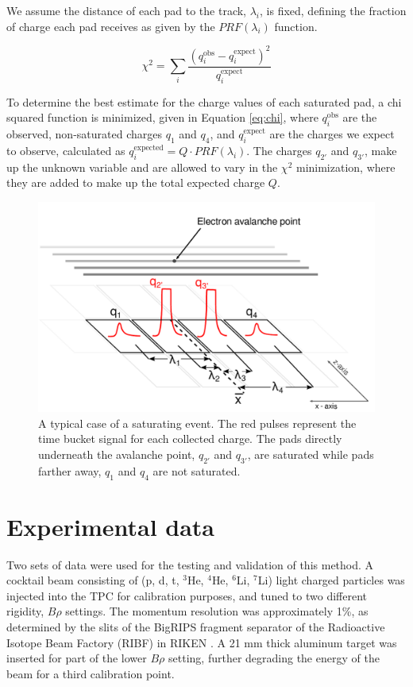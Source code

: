 \documentclass[review,number,sort&compress]{elsarticle}
\begin{document}
We assume the distance of each pad to the track, $\lambda_i$, is fixed, defining the fraction of charge each pad receives as given by the $PRF(\lambda_i)$ function. 


\begin{equation}\label{eq:chi}
\chi^2 = \sum_i \frac{(q_i^{\mathrm{obs}} - q_i^{\mathrm{expect}})^2}{q_i^{\mathrm{expect}}}
\end{equation}


To determine the best estimate for the charge values of each saturated pad, a chi squared function is minimized, given in  Equation \ref{eq:chi}, where $q_i^{\mathrm{obs}}$ are the observed, non-saturated charges $q_{1}$ and $q_{4}$, and $q_i^{\mathrm{expect}}$ are the charges we expect to observe, calculated as $q_i^{\mathrm{expected}} = Q\cdot PRF(\lambda_i)$. The charges $q_{2'}$ and $q_{3'}$, make up the unknown variable and are allowed to vary in the $\chi^2$ minimization, where they are added to make up the total expected charge $Q$.


\begin{figure}[ht!]
\includegraphics[width=\linewidth]{fig8.pdf}
\caption{A typical case of a saturating event. The red pulses represent the time bucket signal for each collected charge. The pads directly underneath the avalanche point, $q_{2'}$ and $q_{3'}$, are saturated while pads farther away, $q_1$ and $q_4$ are not saturated.}
\label{fig:satpad}
\end{figure}

\section{Experimental data}
Two sets of data were used for the testing and validation of this method. A cocktail beam consisting of (p, d, t, ${}^3$He, ${}^4$He, ${}^6$Li, ${}^7$Li) light charged particles was injected into the TPC for calibration purposes, and tuned to two different rigidity, $B\rho$ settings. The momentum resolution was approximately 1\%, as determined by the slits of the BigRIPS fragment separator of the Radioactive Isotope Beam Factory (RIBF) in RIKEN \cite{bigrips}. A 21 mm thick aluminum target was inserted for part of the lower $B\rho$ setting, further degrading the energy of the beam for a third calibration point. 
\end{document}
